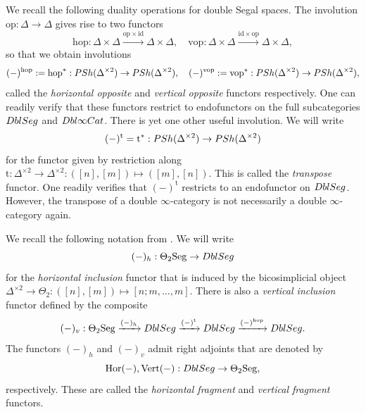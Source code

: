 \documentclass[a4paper, 11pt]{amsart}
\numberwithin{theorem}{section}
\theoremstyle{definition}
\newcommand{\cat}[1]{\textup{#1}}
\newcommand{\op}{\mathrm{op}}
\renewcommand{\Vert}{\mathrm{Vert}}
\newcommand{\Hor}{\mathrm{Hor}}
\newcommand{\Seg}{\mathrm{Seg}}
\newcommand{\tp}{\mathrm{t}}
\newcommand{\DbliCat}{\cat{Dbl}\infty\cat{Cat}}
\newcommand{\DblSeg}{\cat{DblSeg}}
\newcommand{\PSh}{\cat{PSh}}
\newcommand{\id}{\mathrm{id}}
\newcommand{\vop}{\mathrm{vop}}
\newcommand{\hop}{\mathrm{hop}}
\begin{document}
\begin{construction}\label{cons.dualities} 
	We recall the following duality operations for double Segal spaces.
	The involution $\op : \Delta \rightarrow \Delta$ gives rise to two functors 
	$$
	\hop : \Delta \times \Delta \xrightarrow{\op \times \id} \Delta \times \Delta, \quad \vop : \Delta \times \Delta \xrightarrow{\id \times \op} \Delta \times \Delta,
	$$
	so that we obtain involutions
	$$
	(-)^\hop := \hop^* : \PSh(\Delta^{\times 2}) \rightarrow \PSh(\Delta^{\times 2}), \quad (-)^\vop := \vop^* : \PSh(\Delta^{\times 2}) \rightarrow \PSh(\Delta^{\times 2}),
	$$
	called the \textit{horizontal opposite} and \textit{vertical opposite} functors respectively.
	One can readily verify that these functors restrict to endofunctors on the full subcategories $\DblSeg$ and $\DbliCat$.
	There is yet one other useful involution. We will write 
	$$
	(-)^\tp = \tp^* : \PSh(\Delta^{\times 2}) \rightarrow \PSh(\Delta^{\times 2})
	$$ 
	for the functor given by restriction along $\tp : \Delta^{\times 2} \rightarrow \Delta^{\times 2} : ([n],[m]) \mapsto ([m],[n])$. 
	This is called the \textit{transpose} functor. One readily verifies that $(-)^\tp$ restricts to an endofunctor on $\DblSeg$. However, the transpose 
	of a double $\infty$-category is not necessarily a double $\infty$-category again.
\end{construction}


\begin{notation} 
	We recall the following notation from \cite[Section 3.3]{Comp}. We will write 
$$(-)_h  : \Theta_2\Seg \to \DblSeg$$
	for the \textit{horizontal inclusion} functor that is induced by the  bicosimplicial object $\Delta^{\times 2} \to  \Theta_2 : ([n], [m]) \mapsto [n;m,\dotsc, m]$.
	There is also a \textit{vertical inclusion} functor 
defined by the composite 
$$
	(-)_v : \Theta_2\Seg  \xrightarrow{(-)_h} \DblSeg \xrightarrow{(-)^\tp} \DblSeg \xrightarrow{(-)^\hop} \DblSeg.
	$$
	The functors $(-)_h$ and $(-)_v$ admit right adjoints that are denoted by
	$$
	\Hor(-), \Vert(-) : \DblSeg \rightarrow \Theta_2\Seg,
	$$
	respectively. These are called the \textit{horizontal fragment} and \textit{vertical fragment} functors.
\end{notation}
\end{document}
